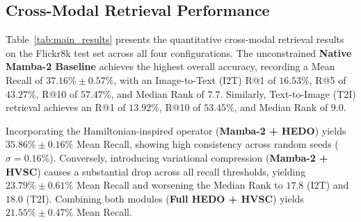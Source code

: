 \documentclass[journal]{IEEEtran}
\begin{document}
\begin{table}[t]
\centering
\caption{Computational efficiency, memory footprint, and latency metrics measured on a single NVIDIA Tesla T4 GPU (16GB VRAM) averaged across all 3 seeds.}
\label{tab:efficiency}
\end{table}

\subsection{Cross-Modal Retrieval Performance}
Table~\ref{tab:main_results} presents the quantitative cross-modal retrieval results on the Flickr8k test set across all four configurations.
The unconstrained \textbf{Native Mamba-2 Baseline} achieves the highest overall accuracy, recording a Mean Recall of $\mathbf{37.16\% \pm 0.57\%}$, with an Image-to-Text (I2T) R@1 of $16.53\%$, R@5 of $43.27\%$, R@10 of $57.47\%$, and Median Rank of $7.7$. Similarly, Text-to-Image (T2I) retrieval achieves an R@1 of $13.92\%$, R@10 of $53.45\%$, and Median Rank of $9.0$.

Incorporating the Hamiltonian-inspired operator (\textbf{Mamba-2 + HEDO}) yields $35.86\% \pm 0.16\%$ Mean Recall, showing high consistency across random seeds ($\sigma = 0.16\%$).
Conversely, introducing variational compression (\textbf{Mamba-2 + HVSC}) causes a substantial drop across all recall thresholds, yielding $23.79\% \pm 0.61\%$ Mean Recall and worsening the Median Rank to $17.8$ (I2T) and $18.0$ (T2I). Combining both modules (\textbf{Full HEDO + HVSC}) yields $21.55\% \pm 0.47\%$ Mean Recall.
\end{document}
